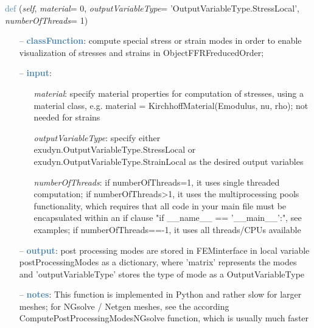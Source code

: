 \begin{itemize}[leftmargin=1.4cm]
\begin{itemize}[leftmargin=0.5cm]
\begin{itemize}[leftmargin=1.4cm]
\begin{itemize}[leftmargin=0.5cm]
\begin{flushleft}
\noindent \textcolor{steelblue}{def {\bf {}}}\label{sec:FEM:FEMinterface:ComputePostProcessingModes}
({\it self}, {\it material}= 0, {\it outputVariableType}= 'OutputVariableType.StressLocal', {\it numberOfThreads}= 1)
\end{flushleft}
\setlength{\itemindent}{0.7cm}
\begin{itemize}[leftmargin=0.7cm]
  \item[--]  \textcolor{steelblue}{\bf classFunction}: compute special stress or strain modes in order to enable visualization of stresses and strains in ObjectFFRFreducedOrder;  \item[--]  \textcolor{steelblue}{\bf input}: \vspace{-6pt}
  \begin{itemize}[leftmargin=1.2cm]
\setlength{\itemindent}{-0.7cm}
    \item[] {\it material}: specify material properties for computation of stresses, using a material class, e.g. material = KirchhoffMaterial(Emodulus, nu, rho); not needed for strains
    \item[] {\it   outputVariableType}: specify either exudyn.OutputVariableType.StressLocal or exudyn.OutputVariableType.StrainLocal as the desired output variables
    \item[] {\it   numberOfThreads}: if numberOfThreads=1, it uses single threaded computation; if numberOfThreads>1, it uses the multiprocessing pools functionality, which requires that all code in your main file must be encapsulated within an if clause "if \_\_name\_\_ == '\_\_main\_\_':", see examples; if numberOfThreads==-1, it uses all threads/CPUs available
  \end{itemize}
  \item[--]  \textcolor{steelblue}{\bf output}: post processing modes are stored in FEMinterface in local variable postProcessingModes as a dictionary, where 'matrix' represents the modes and 'outputVariableType' stores the type of mode as a OutputVariableType  \item[--]  \textcolor{steelblue}{\bf notes}: This function is implemented in Python and rather slow for larger meshes; for NGsolve / Netgen meshes, see the according ComputePostProcessingModesNGsolve function, which is usually much faster\vspace{12pt}\end{itemize}

\end{itemize}
\end{itemize}
\end{itemize}
\end{itemize}
